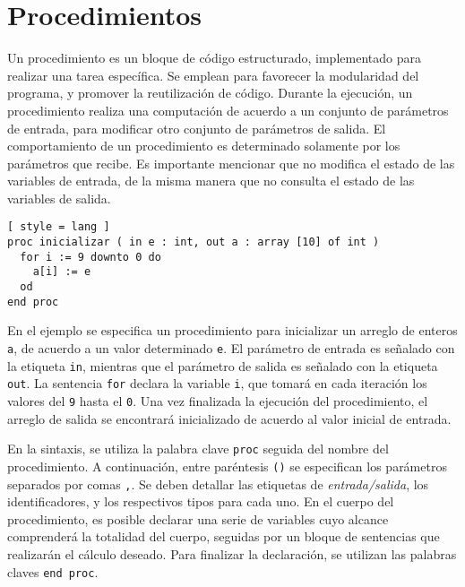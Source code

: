 \iffalse
\section{Procedimientos}

Un procedimiento es un bloque de código estructurado, implementado para realizar una tarea específica.
Se emplean para favorecer la modularidad del programa, y promover la reutilización de código.
Durante la ejecución, un procedimiento realiza una computación de acuerdo a un conjunto de parámetros de entrada, para modificar otro conjunto de parámetros de salida.
El comportamiento de un procedimiento es determinado solamente por los parámetros que recibe.
Es importante mencionar que no modifica el estado de las variables de entrada, de la misma manera que no consulta el estado de las variables de salida.

\begin{lstlisting}[ style = lang ]
proc inicializar ( in e : int, out a : array [10] of int )
  for i := 9 downto 0 do
    a[i] := e
  od
end proc
\end{lstlisting}

En el ejemplo se especifica un procedimiento para inicializar un arreglo de enteros \lstinline[style = lang]{a}, de acuerdo a un valor determinado \lstinline[style = lang]{e}.
El parámetro de entrada es señalado con la etiqueta \lstinline[style = lang]{in}, mientras que el parámetro de salida es señalado con la etiqueta \lstinline[style = lang]{out}.
La sentencia \lstinline[style = lang]{for} declara la variable \lstinline[style = lang]{i}, que tomará en cada iteración los valores del \lstinline[style = lang]{9} hasta el \lstinline[style = lang]{0}.
Una vez finalizada la ejecución del procedimiento, el arreglo de salida se encontrará inicializado de acuerdo al valor inicial de entrada.

En la sintaxis, se utiliza la palabra clave \lstinline[style = lang]{proc} seguida del nombre del procedimiento.
A continuación, entre paréntesis \lstinline[style = lang]{()} se especifican los parámetros separados por comas \lstinline[style = lang]{,}.
Se deben detallar las etiquetas de \textit{entrada/salida}, los identificadores, y los respectivos tipos para cada uno.
En el cuerpo del procedimiento, es posible declarar una serie de variables cuyo alcance comprenderá la totalidad del cuerpo, seguidas por un bloque de sentencias que realizarán el cálculo deseado.
Para finalizar la declaración, se utilizan las palabras claves \lstinline[style = lang]{end proc}.

